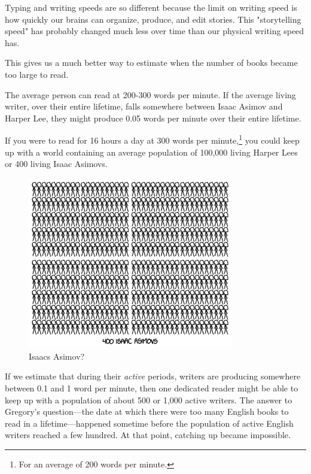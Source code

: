 {{Typing and writing speeds are so different because the limit on writing speed is how quickly our brains can organize, produce, and edit stories. This "storytelling speed" has probably changed much less over time than our physical writing speed has.}

{This gives us a much better way to estimate when the number of books became too large to read.}

{The average person can read at 200-300 words per minute. If the average living writer, over their entire lifetime, falls somewhere between Isaac Asimov and Harper Lee, they might produce 0.05 words per minute over their entire lifetime.}

{If you were to read for 16 hours a day at 300 words per minute,{\footnote{For an average of 200 words per minute.} } you could keep up with a world containing an average population of 100,000 living Harper Lees or 400 living Isaac Asimovs.}

\begin{figure}[!htbp]
\centering
\includegraphics[scale=0.5, max width=0.8\textwidth]{imgs/a/76/books_leeasimov.png}
\caption{Isaacs Asimov?}
\end{figure}

{If we estimate that during their \emph{active} periods, writers are producing somewhere between 0.1 and 1 word per minute, then one dedicated reader might be able to keep up with a population of about 500 or 1,000 active writers. The answer to Gregory's question—the date at which there were too many English books to read in a lifetime—happened sometime before the population of active English writers reached a few hundred. At that point, catching up became impossible.}

}

